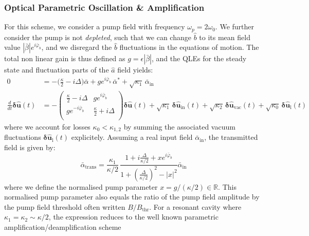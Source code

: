 \subsubsection{Optical Parametric Oscillation \& Amplification}
For this scheme, we consider a pump field with frequency $\omega_p = 2\omega_0$. We further consider the pump is not \textit{depleted}, such that we can change $\hat{b}$ to its mean field value $|\bar{\beta}|e^{i\bar{\varphi}_b}$, and we disregard the $\hat{b}$ fluctuations in the equations of motion. The total non linear gain is thus defined as $g = \epsilon |\bar\beta|$, and the QLEs for the steady state and fluctuation parts of the $\hat{a}$ field yields: 
 \begin{equation}
  \begin{split}
  0 &= -\Big(\frac{\kappa}{2}-i\Delta\Big) \bar{\alpha} +g e^{i\bar{\varphi}_b} \, \bar{\alpha}^* + \sqrt{\kappa_1} \, \bar{\alpha}_{\mathrm{in}} \\
  \frac{d}{dt} \mathbf{\delta \hat{u}}(t)&= - \begin{pmatrix}
  \frac{\kappa}{2}-i\Delta & g e^{i\bar{\varphi}_b}\\ 
   g e^{-i\bar{\varphi}_b} & \frac{\kappa}{2}+i\Delta \\ 
  \end{pmatrix}  \mathbf{\delta \hat{u}}(t) + \sqrt{\kappa_{\mathrm{1}}} \, \mathbf{\delta \hat{u}_{\mathrm{in}}}(t)  + \sqrt{\kappa_2} \, \mathbf{\delta \hat{u}_{\mathrm{vac}}}(t) + \sqrt{\kappa_0} \, \mathbf{\delta \hat{u}_{\mathrm{l}}}(t) 
  \end{split}
\end{equation}
where we account for losses $\kappa_0<\kappa_{1,2}$ by summing the associated vacuum fluctuations $\mathbf{\delta \hat{u}_{\mathrm{l}}}(t) $ explicitely. 
Assuming a real input field $\bar{\alpha}_\textrm{in}$, the transmitted field is given by: 
\begin{equation}
   \bar{\alpha}_{\mathrm{trans}} = \frac{\kappa_1}{\kappa/2} \, \frac{1+i\frac{\Delta}{\kappa/2}+xe^{i\bar{\varphi}_b}}{1+(\frac{\Delta}{\kappa/2})^2 - |x|^2}  \bar{\alpha}_\textrm{in}
\end{equation}
where we define the normalised pump parameter $x = g / (\kappa/2) \in\mathbb{R}$. This normalised pump parameter also equals the ratio of the pump field amplitude by the pump field threshold often written $B/B_{\mathrm{thr}}$. For a resonant cavity where $\kappa_1 = \kappa_2 \sim \kappa/2$, the expression reduces to the well known parametric amplification/deamplification scheme 
